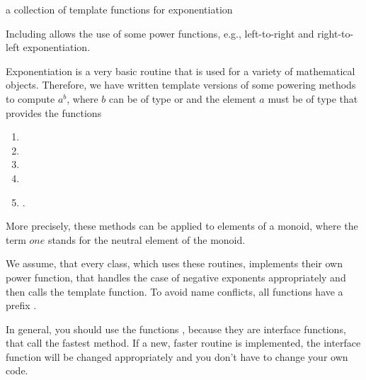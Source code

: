 


\NAME

 \dotfill a collection of template functions for exponentiation



\ABSTRACT

Including  allows the use of some power functions, e.g.,
left-to-right and right-to-left exponentiation.



\DESCRIPTION

Exponentiation is a very basic routine that is used for a variety of mathematical objects.
Therefore, we have written template versions of some powering methods to compute $a^b$, where
$b$ can be of type  or  and the element $a$ must be of type
 that provides the functions
\begin{enumerate}
\item {}
\item {}
\item {}
\item {}
\item {}.
\end{enumerate}
More precisely, these methods can be applied to elements of a monoid, where the term
$\mathit{one}$ stands for the neutral element of the monoid.

We assume, that every class, which uses these routines, implements their own power function,
that handles the case of negative exponents appropriately and then calls the template function.
To avoid name conflicts, all functions have a prefix .

In general, you should use the functions , because they are interface
functions, that call the fastest method.  If a new, faster routine is implemented, the interface
function will be changed appropriately and you don't have to change your own code.

